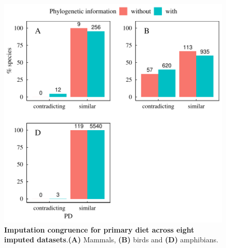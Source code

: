 \documentclass[11pt]{article}
\begin{document}
\pagebreak
\begin{figure}[h!]
\centering
\includegraphics[scale=0.6]{figures/Congruence_categorical_traits/PD}
\caption[Imputation congruence for primary diet across eight imputed datasets]{\textbf{Imputation congruence for primary diet across eight imputed datasets}.\textbf{(A)} Mammals, \textbf{(B)} birds and \textbf{(D)} amphibians.}
\label{congruencePD}
\end{figure}
\end{document}
